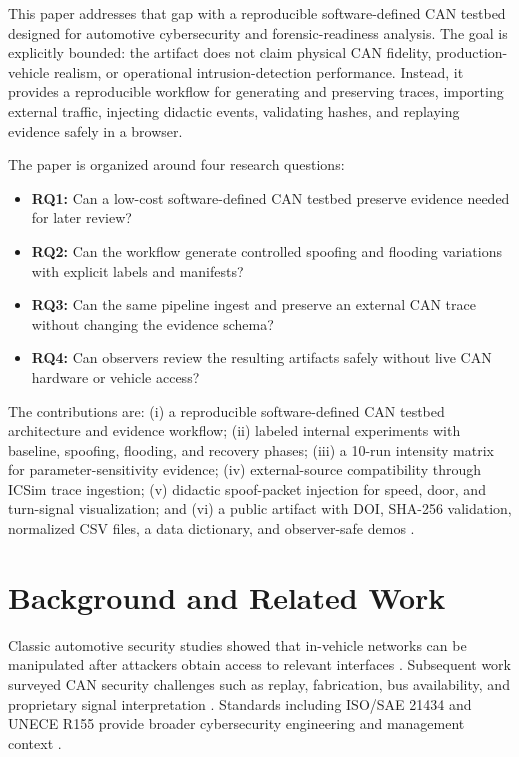 \documentclass[conference]{IEEEtran}
\begin{document}
This paper addresses that gap with a reproducible software-defined CAN testbed designed for automotive cybersecurity and forensic-readiness analysis. The goal is explicitly bounded: the artifact does not claim physical CAN fidelity, production-vehicle realism, or operational intrusion-detection performance. Instead, it provides a reproducible workflow for generating and preserving traces, importing external traffic, injecting didactic events, validating hashes, and replaying evidence safely in a browser.

The paper is organized around four research questions:
\begin{itemize}
  \item \textbf{RQ1:} Can a low-cost software-defined CAN testbed preserve evidence needed for later review?
  \item \textbf{RQ2:} Can the workflow generate controlled spoofing and flooding variations with explicit labels and manifests?
  \item \textbf{RQ3:} Can the same pipeline ingest and preserve an external CAN trace without changing the evidence schema?
  \item \textbf{RQ4:} Can observers review the resulting artifacts safely without live CAN hardware or vehicle access?
\end{itemize}

The contributions are: (i) a reproducible software-defined CAN testbed architecture and evidence workflow; (ii) labeled internal experiments with baseline, spoofing, flooding, and recovery phases; (iii) a 10-run intensity matrix for parameter-sensitivity evidence; (iv) external-source compatibility through ICSim trace ingestion; (v) didactic spoof-packet injection for speed, door, and turn-signal visualization; and (vi) a public artifact with DOI, SHA-256 validation, normalized CSV files, a data dictionary, and observer-safe demos \cite{janeri2026artifact}.

\section{Background and Related Work}
Classic automotive security studies showed that in-vehicle networks can be manipulated after attackers obtain access to relevant interfaces \cite{koscher2010experimental,checkoway2011comprehensive,miller2015remote}. Subsequent work surveyed CAN security challenges such as replay, fabrication, bus availability, and proprietary signal interpretation \cite{bozdal2020evaluation,lokman2019survey}. Standards including ISO/SAE 21434 and UNECE R155 provide broader cybersecurity engineering and management context \cite{iso21434,uneceR155}.
\end{document}
